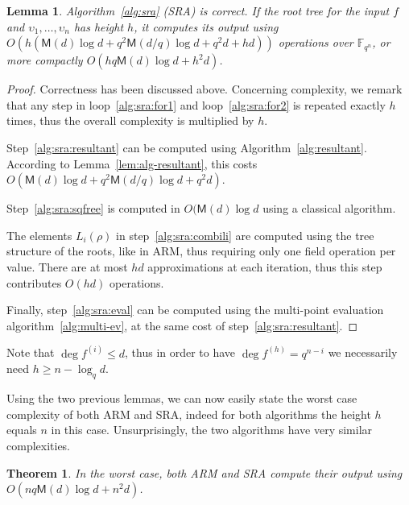 \documentclass{sig-alternate}
\newcommand{\ff}[1]{\mathbb{F}_{#1}}
\newcommand{\dd}{d}
\newcommand{\qq}{q}
\newcommand{\nn}{n}
\newcommand{\qn}{{\qq^\nn}}
\newcommand{\extf}{\ff{\qn}}
\newcommand{\Mul}{\mathsf{M}}
\newcounter{algo}
\newtheorem{Theo}{Theorem}
\newtheorem{Lem}{Lemma}
\begin{document}
 \begin{Lem}
 \label{complexity_sra}
   Algorithm~\ref{alg:sra} (SRA) is correct. If the root tree for the
   input $f$ and $\upsilon_1,\dots,\upsilon_\nn$ has height $h$, it computes its
   output using $O\left(h(\Mul(\dd)\log \dd +
     \qq^2\Mul(\dd/\qq)\log\dd + \qq^2\dd + h\dd)\right)$ operations
   over $\extf$, or more compactly $O(h\qq\Mul(\dd)\log\dd + h^2\dd)$.
 \end{Lem}
 \begin{proof}
   Correctness has been discussed above. Concerning complexity, we
   remark that any step in loop~\ref{alg:sra:for1} and
   loop~\ref{alg:sra:for2} is repeated exactly $h$ times, thus the
   overall complexity is multiplied by $h$.

   Step~\ref{alg:sra:resultant} can be computed using
   Algorithm~\ref{alg:resultant}. According to
   Lemma~\ref{lem:alg-resultant}, this costs $O(\Mul(\dd) \log\dd +
   \qq^2\Mul(\dd/\qq)\log\dd + \qq^2\dd)$.

   Step~\ref{alg:sra:sqfree} is computed in $O(\Mul(\dd)\log\dd$ using
   a classical algorithm.

   The elements $L_i(\rho)$ in step~\ref{alg:sra:combili} are computed
   using the tree structure of the roots, like in ARM, thus requiring
   only one field operation per value. There are at most $hd$
   approximations at each iteration, thus this step contributes
   $O(hd)$ operations.
   
   Finally, step~\ref{alg:sra:eval} can be computed using the
   multi-point evaluation algorithm~\ref{alg:multi-ev}, at the same
   cost of step~\ref{alg:sra:resultant}.
 \end{proof}
   

Note that $\deg f^{(i)} \le  d$, thus in order to have $\deg f^{(h)} = q^{n-i}$
we necessarily need $h \ge  \nn - \log_\qq \dd$.

 \medskip 
  
  
 Using the two previous lemmas, we can now easily state the worst case
 complexity of both ARM and SRA, indeed for both algorithms the height
 $h$ equals $\nn$ in this case. Unsurprisingly, the two algorithms
 have very similar complexities.

 \begin{Theo}
   In the worst case, both ARM and SRA compute their output using
   $O(nq\Mul(d)\log d + n^2d)$.
 \end{Theo}
 
\end{document}
